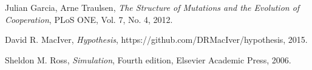 \documentclass[a4paper,11pt]{article}
\begin{document}
\begin{thebibliography}{9}

        Julian Garcia, Arne Traulsen,
        \emph{The Structure of Mutations and the Evolution of Cooperation},
        PLoS ONE,
        Vol. 7,
        No. 4,
        2012.

        David R. MacIver,
        \emph{Hypothesis},
        https://github.com/DRMacIver/hypothesis,
        2015.

        Sheldon M. Ross,
        \emph{Simulation},
        Fourth edition,
        Elsevier Academic Press,
        2006.

\end{thebibliography}
\end{document}
